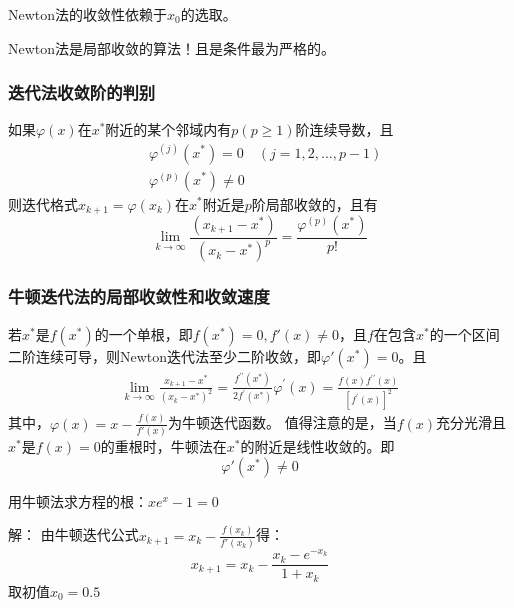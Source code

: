 \begin{remark}
    Newton法的收敛性依赖于$x_0$的选取。
\end{remark}

\begin{notice}
    Newton法是局部收敛的算法！且是条件最为严格的。
\end{notice}

\subsubsection{迭代法收敛阶的判别}
\begin{theorem}
    如果$\varphi(x)$在$x^*$附近的某个邻域内有$p(p \geq 1)$阶连续导数，且
    \begin{align*}
        &\varphi^{(j)}(x^*)=0 \quad(j=1,2,\ldots,p-1)\\
        &\varphi^{(p)}(x^*) \neq 0
    \end{align*}
    则迭代格式$x_{k+1} = \varphi(x_k)$在$x^*$附近是$p$阶局部收敛的，且有
    \begin{equation*}
        \lim_{k\to\infty}\frac{(x_{k+1}-x^*)}{(x_k-x^*)^p}=\frac{\varphi^{(p)}(x^*)}{p!}
    \end{equation*}
\end{theorem}

\subsubsection{牛顿迭代法的局部收敛性和收敛速度}
若$x^*$是$f(x^*)$的一个单根，即$f(x^*) = 0,f'(x) \neq 0$，且$f$在包含$x^*$的一个区间二阶连续可导，则Newton迭代法至少二阶收敛，即$\varphi'(x^*) = 0$。且
\begin{align*}
    \lim_{k\to\infty}\frac{x_{k+1}-x^*}{\left(x_k-x^*\right)^2}=\frac{f^{\prime\prime}(x^*)}{2f^{\prime}(x^*)}
    \varphi^{\prime}(x)=\frac{f(x)f^{\prime\prime}(x)}{\left[f^{\prime}(x)\right]^2}
\end{align*}
其中，$\varphi(x) = x-\frac{f(x)}{f'(x)}$为牛顿迭代函数。
值得注意的是，当$f(x)$充分光滑且$x^*$是$f(x) = 0$的重根时，牛顿法在$x^*$的附近是线性收敛的。即
\begin{equation*}
    \varphi'(x^*) \neq 0
\end{equation*}

\begin{example}
    用牛顿法求方程的根：$xe^x-1 = 0$
    \begin{solution}
        解：
        由牛顿迭代公式$x_{k+1}=x_k-\frac{f(x_k)}{f'(x_k)}$得：
        \begin{equation*}
            x_{k+1}=x_k-\frac{x_k-e^{-x_k}}{1+x_k}
        \end{equation*}
        取初值$x_0 = 0.5$
    \end{solution}
\end{example}

